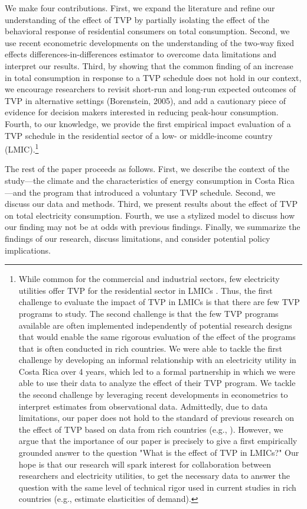 \documentclass[12pt]{article}
\begin{document}
We make four contributions. First, we expand the literature and refine our understanding of the effect of TVP by partially isolating the effect of the behavioral response of residential consumers on total consumption. Second, we use recent econometric developments on the understanding of the two-way fixed effects differences-in-differences estimator to overcome data limitations and interpret our results. Third, by showing that the common finding of an increase in total consumption in response to a TVP schedule does not hold in our context, we encourage researchers to revisit short-run and long-run expected outcomes of TVP in alternative settings (Borenstein, 2005), and add a cautionary piece of evidence for decision makers interested in reducing peak-hour consumption. Fourth, to our knowledge, we provide the first empirical impact evaluation of a TVP schedule in the residential sector of a low- or middle-income country (LMIC).\footnote{While common for the commercial and industrial sectors, few electricity utilities offer TVP for the residential sector in LMICs \citep{duttaLiteratureReviewDynamic2017}. Thus, the first challenge to evaluate the impact of TVP in LMICs is that there are few TVP programs to study. The second challenge is that the few TVP programs available are often implemented independently of potential research designs that would enable the same rigorous evaluation of the effect of the programs that is often conducted in rich countries. We were able to tackle the first challenge by developing an informal relationship with an electricity utility in Costa Rica over 4 years, which led to a formal partnership in which we were able to use their data to analyze the effect of their TVP program. We tackle the second challenge by leveraging recent developments in econometrics to interpret estimates from observational data. Admittedly, due to data limitations, our paper does not hold to the standard of previous research on the effect of TVP based on data from rich countries (e.g., \cite{allcottRethinkingRealtimeElectricity2011}). However, we argue that the importance of our paper is precisely to give a first empirically grounded answer to the question "What is the effect of TVP in LMICs?" Our hope is that our research will spark interest for collaboration between researchers and electricity utilities, to get the necessary data to answer the question with the same level of technical rigor used in current studies in rich countries (e.g., estimate elasticities of demand).}

The rest of the paper proceeds as follows. First, we describe the context of the study---the climate and the characteristics of energy consumption in Costa Rica---and the program that introduced a voluntary TVP schedule. Second, we discuss our data and methods. Third, we present results about the effect of TVP on total electricity consumption. Fourth, we use a stylized model to discuss how our finding may not be at odds with previous findings. Finally, we summarize the findings of our research, discuss limitations, and consider potential policy implications.
\end{document}
